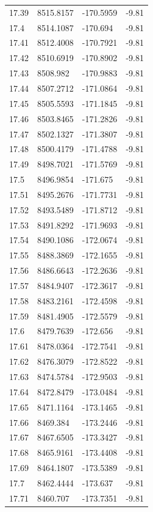 \begin{table}[H]
\begin{tabular}{llll}
17.39 & 8515.8157 & -170.5959 & -9.81 \\
17.4 & 8514.1087 & -170.694 & -9.81 \\
17.41 & 8512.4008 & -170.7921 & -9.81 \\
17.42 & 8510.6919 & -170.8902 & -9.81 \\
17.43 & 8508.982 & -170.9883 & -9.81 \\
17.44 & 8507.2712 & -171.0864 & -9.81 \\
17.45 & 8505.5593 & -171.1845 & -9.81 \\
17.46 & 8503.8465 & -171.2826 & -9.81 \\
17.47 & 8502.1327 & -171.3807 & -9.81 \\
17.48 & 8500.4179 & -171.4788 & -9.81 \\
17.49 & 8498.7021 & -171.5769 & -9.81 \\
17.5 & 8496.9854 & -171.675 & -9.81 \\
17.51 & 8495.2676 & -171.7731 & -9.81 \\
17.52 & 8493.5489 & -171.8712 & -9.81 \\
17.53 & 8491.8292 & -171.9693 & -9.81 \\
17.54 & 8490.1086 & -172.0674 & -9.81 \\
17.55 & 8488.3869 & -172.1655 & -9.81 \\
17.56 & 8486.6643 & -172.2636 & -9.81 \\
17.57 & 8484.9407 & -172.3617 & -9.81 \\
17.58 & 8483.2161 & -172.4598 & -9.81 \\
17.59 & 8481.4905 & -172.5579 & -9.81 \\
17.6 & 8479.7639 & -172.656 & -9.81 \\
17.61 & 8478.0364 & -172.7541 & -9.81 \\
17.62 & 8476.3079 & -172.8522 & -9.81 \\
17.63 & 8474.5784 & -172.9503 & -9.81 \\
17.64 & 8472.8479 & -173.0484 & -9.81 \\
17.65 & 8471.1164 & -173.1465 & -9.81 \\
17.66 & 8469.384 & -173.2446 & -9.81 \\
17.67 & 8467.6505 & -173.3427 & -9.81 \\
17.68 & 8465.9161 & -173.4408 & -9.81 \\
17.69 & 8464.1807 & -173.5389 & -9.81 \\
17.7 & 8462.4444 & -173.637 & -9.81 \\
17.71 & 8460.707 & -173.7351 & -9.81 \\

\end{tabular}
\end{table}
